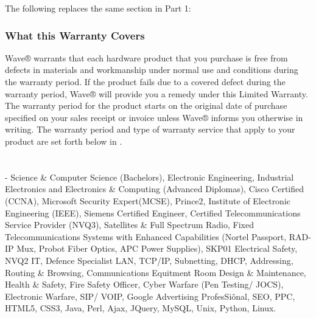 \documentclass[letterpaper,10pt,english]{sphinxmanual}
\begin{document}
The following replaces the same section in Part 1:


\subsection{What this Warranty Covers}
\label{\detokenize{part3:what-this-warranty-covers}}
Wave® warrants that each hardware product that you purchase is free from defects in materials and workmanship under normal use and conditions during the warranty period. If the product fails due to a covered defect during the warranty period, Wave® will provide you a remedy under this Limited Warranty. The warranty period for the product starts on the original date of purchase specified on your sales receipt or invoice unless Wave® informs you otherwise in writing. The warranty period and type of warranty service that apply to your product are set forth below in .


\chapter{}
\label{\detokenize{index:document-author-s}}
 - Science \& Computer Science (Bachelors), Electronic Engineering, Industrial Electronics and Electronics \& Computing (Advanced Diplomas), Cisco Certified (CCNA), Microsoft Security Expert(MCSE), Prince2, Institute of Electronic Engineering (IEEE), Siemens Certified Engineer, Certified Telecommunications Service Provider (NVQ3), Satellites \& Full Spectrum Radio, Fixed Telecommunications Systems with Enhanced Capabilities (Nortel Passport, RAD-IP Mux, Probot Fiber Optics, APC Power Supplies), SKP01 Electrical Safety, NVQ2 IT, Defence Specialist LAN, TCP/IP, Subnetting, DHCP, Addressing, Routing \& Browsing, Communications Equitment Room Design \& Maintenance, Health \& Safety, Fire Safety Officer, Cyber Warfare (Pen Testing/ JOCS), Electronic Warfare, SIP/ VOIP, Google Advertising ProfesSiônal, SEO, PPC, HTML5, CSS3, Java, Perl, Ajax, JQuery, MySQL, Unix, Python, Linux.
\end{document}
